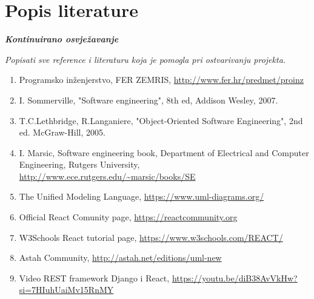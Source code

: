 \chapter*{Popis literature}
	 	
 		\textbf{\textit{Kontinuirano osvježavanje}}
	
		\textit{Popisati sve reference i literaturu koja je pomogla pri ostvarivanju projekta.}
		
		
		\begin{enumerate}
			
			
			\item  Programsko inženjerstvo, FER ZEMRIS, \url{http://www.fer.hr/predmet/proinz}
			
			\item  I. Sommerville, "Software engineering", 8th ed, Addison Wesley, 2007.
			
			\item  T.C.Lethbridge, R.Langaniere, "Object-Oriented Software Engineering", 2nd ed. McGraw-Hill, 2005.
			
			\item  I. Marsic, Software engineering book, Department of Electrical and Computer Engineering, Rutgers University, \url{http://www.ece.rutgers.edu/~marsic/books/SE}
			
			\item  The Unified Modeling Language, \url{https://www.uml-diagrams.org/}

			\item Official React Comunity page, \url{https://reactcommunity.org}

			\item W3Schools React tutorial page, \url{https://www.w3schools.com/REACT/}
			
			\item  Astah Community, \url{http://astah.net/editions/uml-new}

			\item  Video REST framework Django i React, \url{https://youtu.be/diB38AvVkHw?si=7HIuhUaiMv15RnMY}

		\end{enumerate}
		
		 
